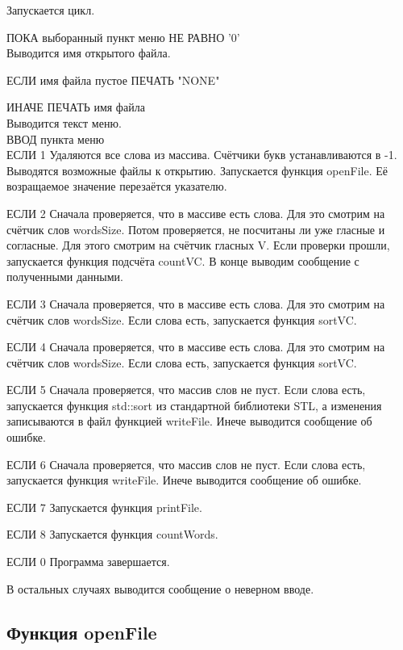 \documentclass[12pt,a4paper]{article}  %
\begin{document}
Запускается цикл.

ПОКА выборанный пункт меню НЕ РАВНО '0'\\

Выводится имя открытого файла.

ЕСЛИ имя файла пустое ПЕЧАТЬ "NONE"

ИНАЧЕ ПЕЧАТЬ имя файла\\

Выводится текст меню.\\

ВВОД пункта меню\\

ЕСЛИ 1 
Удаляются все слова из массива. Счётчики букв устанавливаются в -1. Выводятся возможные файлы к открытию. Запускается функция openFile. Её возращаемое значение перезаётся указателю.

ЕСЛИ 2
Сначала проверяется, что в массиве есть слова. Для это смотрим на счётчик слов wordsSize. Потом проверяется, не посчитаны ли уже гласные и согласные. Для этого смотрим на счётчик гласных V. Если проверки прошли, запускается функция подсчёта countVC. В конце выводим сообщение с полученными данными.

ЕСЛИ 3
Сначала проверяется, что в массиве есть слова. Для это смотрим на счётчик слов wordsSize. Если слова есть, запускается функция sortVC.

ЕСЛИ 4
Сначала проверяется, что в массиве есть слова. Для это смотрим на счётчик слов wordsSize. Если слова есть, запускается функция sortVC.

ЕСЛИ 5
Сначала проверяется, что массив слов не пуст. Если слова есть, запускается функция std::sort из стандартной библиотеки STL, а изменения записываются в файл функцией writeFile. Инече выводится сообщение об ошибке.

ЕСЛИ 6
Сначала проверяется, что массив слов не пуст. Если слова есть, запускается функция writeFile. Инече выводится сообщение об ошибке.

ЕСЛИ 7
Запускается функция printFile.

ЕСЛИ 8
Запускается функция countWords.

ЕСЛИ 0
Программа завершается.

В остальных случаях выводится сообщение о неверном вводе.



\subsection*{Функция openFile}
\end{document}
